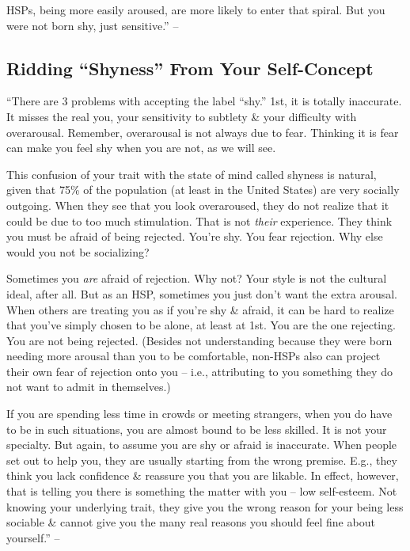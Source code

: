 \documentclass{article}
\numberwithin{equation}{section}
\begin{document}
HSPs, being more easily aroused, are more likely to enter that spiral. But you were not born shy, just sensitive.'' -- \cite[pp. 122--123]{Aron2013}

\subsection{Ridding ``Shyness'' From Your Self-Concept}
``There are 3 problems with accepting the label ``shy.'' 1st, it is totally inaccurate. It misses the real you, your sensitivity to subtlety \& your difficulty with overarousal. Remember, overarousal is not always due to fear. Thinking it is fear can make you feel shy when you are not, as we will see.

This confusion of your trait with the state of mind called shyness is natural, given that 75\% of the population (at least in the United States) are very socially outgoing. When they see that you look overaroused, they do not realize that it could be due to too much stimulation. That is not \textit{their} experience. They think you must be afraid of being rejected. You're shy. You fear rejection. Why else would you not be socializing?

Sometimes you \textit{are} afraid of rejection. Why not? Your style is not the cultural ideal, after all. But as an HSP, sometimes you just don't want the extra arousal. When others are treating you as if you're shy \& afraid, it can be hard to realize that you've simply chosen to be alone, at least at 1st. You are the one rejecting. You are not being rejected. (Besides not understanding because they were born needing more arousal than you to be comfortable, non-HSPs also can project their own fear of rejection onto you -- i.e., attributing to you something they do not want to admit in themselves.)

If you are spending less time in crowds or meeting strangers, when you do have to be in such situations, you are almost bound to be less skilled. It is not your specialty. But again, to assume you are shy or afraid is inaccurate. When people set out to help you, they are usually starting from the wrong premise. E.g., they think you lack confidence \& reassure you that you are likable. In effect, however, that is telling you there is something the matter with you -- low self-esteem. Not knowing your underlying trait, they give you the wrong reason for your being less sociable \& cannot give you the many real reasons you should feel fine about yourself.'' -- \cite[pp. 123--124]{Aron2013}
\end{document}
